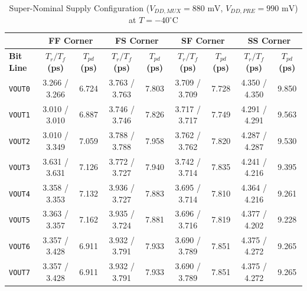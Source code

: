 \begin{table}[H]
    \centering
    \renewcommand{\arraystretch}{1.3}
    \setlength{\tabcolsep}{4pt}
    \small
    \begin{tabular}{|l|cc|cc|cc|cc|}
        \hline
        & \multicolumn{2}{c|}{\textbf{FF Corner}} & \multicolumn{2}{c|}{\textbf{FS Corner}} & \multicolumn{2}{c|}{\textbf{SF Corner}} & \multicolumn{2}{c|}{\textbf{SS Corner}} \\ \hline
        \textbf{Bit Line} & \textbf{$T_r / T_f$ (ps)} & \textbf{$T_{pd}$ (ps)} & \textbf{$T_r / T_f$ (ps)} & \textbf{$T_{pd}$ (ps)} & \textbf{$T_r / T_f$ (ps)} & \textbf{$T_{pd}$ (ps)} & \textbf{$T_r / T_f$ (ps)} & \textbf{$T_{pd}$ (ps)} \\ \hline
        \texttt{VOUT0} & 3.266 / 3.266 & 6.724 & 3.763 / 3.763 & 7.803 & 3.709 / 3.709 & 7.728 & 4.350 / 4.350 & 9.850 \\ 
        \texttt{VOUT1} & 3.010 / 3.010 & 6.887 & 3.746 / 3.746 & 7.826 & 3.717 / 3.717 & 7.749 & 4.291 / 4.291 & 9.563 \\ 
        \texttt{VOUT2} & 3.010 / 3.349 & 7.059 & 3.788 / 3.788 & 7.958 & 3.762 / 3.762 & 7.820 & 4.287 / 4.287 & 9.530 \\ 
        \texttt{VOUT3} & 3.631 / 3.631 & 7.126 & 3.772 / 3.727 & 7.940 & 3.742 / 3.714 & 7.835 & 4.241 / 4.216 & 9.395 \\ 
        \texttt{VOUT4} & 3.358 / 3.353 & 7.132 & 3.936 / 3.727 & 7.883 & 3.695 / 3.714 & 7.810 & 4.364 / 4.216 & 9.261 \\ 
        \texttt{VOUT5} & 3.363 / 3.357 & 7.162 & 3.935 / 3.724 & 7.881 & 3.696 / 3.716 & 7.819 & 4.377 / 4.202 & 9.228 \\ 
        \texttt{VOUT6} & 3.357 / 3.428 & 6.911 & 3.932 / 3.791 & 7.933 & 3.690 / 3.789 & 7.851 & 4.375 / 4.272 & 9.265 \\ 
        \texttt{VOUT7} & 3.357 / 3.428 & 6.911 & 3.932 / 3.791 & 7.933 & 3.690 / 3.789 & 7.851 & 4.375 / 4.272 & 9.265 \\ \hline
    \end{tabular}
    \vspace{2mm}
    \caption{Super-Nominal Supply Configuration ($V_{DD,MUX} = 880\text{ mV}$, $V_{DD,PRE} = 990\text{ mV}$) at $T = -40^{\circ}\text{C}$}
    \label{tab:supernominal_sym_40}
\end{table}

